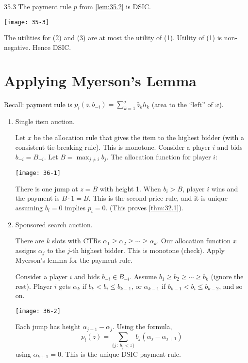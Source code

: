 \documentclass[12pt,letterpaper]{report}
\begin{document}
\begin{lem}{}{35.3}
  The payment rule $p$ from \cref{lem:35.2} is DSIC.
\end{lem}

\begin{thmproof}
  \begin{center}
    \texttt{[image: 35-3]}
  \end{center}
  The utilities for (2) and (3) are at most the utility of (1).
  Utility of (1) is non-negative.
  Hence DSIC.
\end{thmproof}

\section{Applying Myerson's Lemma}

Recall: payment rule is $p_i(z, b_{-i}) = \sum\limits_{k = 1}^j \bar{z}_k h_k$ (area to the ``left''
of $x$).

\begin{enumerate}
  \item
  Single item auction.

  Let $x$ be the allocation rule that gives the item to the highest bidder (with a consistent
  tie-breaking rule).
  This is monotone.
  Consider a player $i$ and bids $b_{-i} = B_{-i}$.
  Let $B = \max_{j \neq i} b_j$.
  The allocation function for player $i$:
  \begin{center}
    \texttt{[image: 36-1]}
  \end{center}
  There is one jump at $z = B$ with height 1.
  When $b_i > B$, player $i$ wins and the payment is $B \cdot 1 = B$.
  This is the second-price rule, and it is unique assuming $b_i = 0$ implies $p_i = 0$.
  (This proves \cref{thm:32.1}).

  \item
  Sponsored search auction.

  There are $k$ slots with CTRs $\alpha_1 \geq \alpha_2 \geq \cdots \geq \alpha_k$.
  Our allocation function $x$ assigns $\alpha_j$ to the $j$-th highest bidder.
  This is monotone (check).
  Apply Myerson's lemma for the payment rule.

  Consider a player $i$ and bids $b_{-i} \in B_{-i}$.
  Assume $b_1 \geq b_2 \geq \cdots \geq b_k$ (ignore the rest).
  Player $i$ gets $\alpha_k$ if $b_k < b_i \leq b_{k - 1}$, or $\alpha_{k - 1}$ if
  $b_{k - 1} < b_i \leq b_{k - 2}$, and so on.
  \begin{center}
    \texttt{[image: 36-2]}
  \end{center}
  Each jump has height $\alpha_{j - 1} - \alpha_j$.
  Using the formula,
  \[
    p_i(z) = \sum_{\{ j \, : \, b_j < z\}} b_j (\alpha_j - \alpha_{j + 1})
  \]
  using $\alpha_{k + 1} = 0$.
  This is the unique DSIC payment rule.
\end{enumerate}
\end{document}
